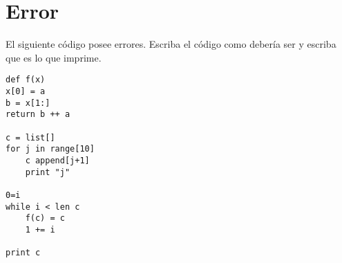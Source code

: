 \section{Error}

El siguiente código posee errores. Escriba el código como debería ser y escriba que es lo que imprime.

\begin{lstlisting}[style=consola]
def f(x)
x[0] = a
b = x[1:]
return b ++ a

c = list[]
for j in range[10]
	c append[j+1]
	print "j"

0=i
while i < len c
	f(c) = c
	1 += i

print c

\end{lstlisting}